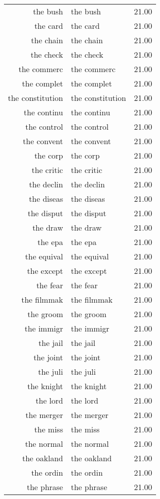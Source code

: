 \begin{table}[ht]
\begin{tabular}{rlr}
  the bush & the bush & 21.00 \\ 
  the card & the card & 21.00 \\ 
  the chain & the chain & 21.00 \\ 
  the check & the check & 21.00 \\ 
  the commerc & the commerc & 21.00 \\ 
  the complet & the complet & 21.00 \\ 
  the constitution & the constitution & 21.00 \\ 
  the continu & the continu & 21.00 \\ 
  the control & the control & 21.00 \\ 
  the convent & the convent & 21.00 \\ 
  the corp & the corp & 21.00 \\ 
  the critic & the critic & 21.00 \\ 
  the declin & the declin & 21.00 \\ 
  the diseas & the diseas & 21.00 \\ 
  the disput & the disput & 21.00 \\ 
  the draw & the draw & 21.00 \\ 
  the epa & the epa & 21.00 \\ 
  the equival & the equival & 21.00 \\ 
  the except & the except & 21.00 \\ 
  the fear & the fear & 21.00 \\ 
  the filmmak & the filmmak & 21.00 \\ 
  the groom & the groom & 21.00 \\ 
  the immigr & the immigr & 21.00 \\ 
  the jail & the jail & 21.00 \\ 
  the joint & the joint & 21.00 \\ 
  the juli & the juli & 21.00 \\ 
  the knight & the knight & 21.00 \\ 
  the lord & the lord & 21.00 \\ 
  the merger & the merger & 21.00 \\ 
  the miss & the miss & 21.00 \\ 
  the normal & the normal & 21.00 \\ 
  the oakland & the oakland & 21.00 \\ 
  the ordin & the ordin & 21.00 \\ 
  the phrase & the phrase & 21.00 \\ 

\end{tabular}
\end{table}

